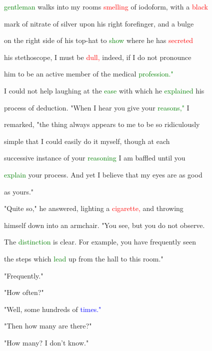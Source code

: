  \textcolor{green}{gentleman} walks into my rooms \textcolor{red}{smelling} of iodoform, with a \textcolor{red}{black}

 mark of nitrate of silver upon his right forefinger, and a bulge

 on the right side of his top-hat to \textcolor{green}{show} where he has \textcolor{red}{secreted}

 his stethoscope, I must be \textcolor{red}{dull,} indeed, if I do not pronounce

 him to be an active member of the \textcolor{BurntOrange}{medical} \textcolor{green}{profession."}



 I could not help \textcolor{BurntOrange}{laughing} at the \textcolor{green}{ease} with which he \textcolor{green}{explained} his

 process of deduction. "When I hear you give your \textcolor{green}{reasons,"} I

 remarked, "the thing always appears to me to be so ridiculously

 simple that I could easily do it myself, though at each

 successive instance of your \textcolor{green}{reasoning} I am baffled until you

 \textcolor{green}{explain} your process. And yet I believe that my eyes are as \textcolor{BurntOrange}{good}

 as yours."



 "Quite so," he answered, lighting a \textcolor{red}{cigarette,} and throwing

 himself down into an armchair. "You see, but you do not observe.

 The \textcolor{green}{distinction} is clear. For example, you have frequently seen

 the steps which \textcolor{green}{lead} up from the hall to this room."



 "Frequently."



 "How often?"



 "Well, some hundreds of \textcolor{blue}{times."}



 "Then how many are there?"



 "How many? I don't know."



